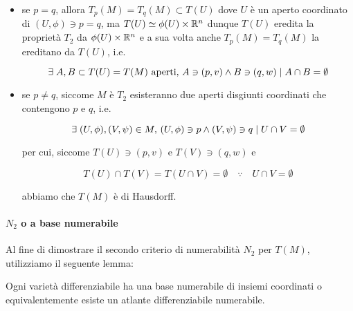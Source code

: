 \begin{itemize}
	\item se $ p = q $, allora $ T_{p}(M) = T_{q}(M) \subset T(U) $ dove $ U $ è un aperto coordinato di $ (U,\phi) \ni p=q $, ma $ T(U) \simeq \phi(U) \times \mathbb{R}^{n} $ dunque $ T(U) $ eredita la proprietà $ T_{2} $ da $ \phi(U) \times \mathbb{R}^{n} $ e a sua volta anche $ T_{p}(M) = T_{q}(M) $ la ereditano da $ T(U) $, i.e.
	
	\begin{equation}
		\exists \; A,B \subset T(U) = T(M) \text{ aperti}, \, A \ni (p,v) \wedge B \ni (q,w) \mid A \cap B = \emptyset
	\end{equation}
	
	\item se $ p \neq q $, siccome $ M $ è $ T_{2} $ esisteranno due aperti disgiunti coordinati che contengono $ p $ e $ q $, i.e.
	
	\begin{equation}
		\exists \; (U,\phi),(V,\psi) \in M, \, (U,\phi) \ni p \wedge (V,\psi) \ni q \mid U \cap V = \emptyset
	\end{equation}

	per cui, siccome $ T(U) \ni (p,v) $ e $ T(V) \ni (q,w) $ e
	
	\begin{equation}
		T(U) \cap T(V) = T(U \cap V) = \emptyset \quad \because \quad U \cap V = \emptyset
	\end{equation}

	abbiamo che $ T(M) $ è di Hausdorff.
\end{itemize}

\paragraph{$ N_{2} $ o a base numerabile}

Al fine di dimostrare il secondo criterio di numerabilità $ N_{2} $ per $ T(M) $, utilizziamo il seguente lemma:

\begin{lemma}
	Ogni varietà differenziabile ha una base numerabile di insiemi coordinati o equivalentemente esiste un atlante differenziabile numerabile.
\end{lemma}

